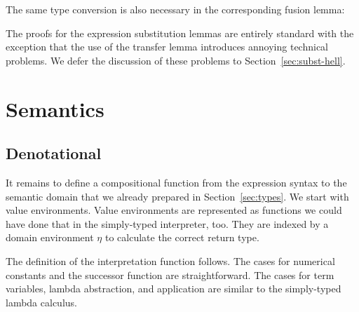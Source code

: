 \documentclass[acmsmall,anonymous,review,screen]{acmart}
\begin{document}
The same type conversion is also necessary in the corresponding fusion lemma:
\SubstExamplesFusionESubESub

The proofs for the expression substitution lemmas are entirely standard with the
exception that the use of the transfer lemma introduces annoying technical problems.
We defer the discussion of these problems to Section~\ref{sec:subst-hell}.


\section{Semantics}
\label{sec:semantics}

\subsection{Denotational}
\label{sec:denotational}



It remains to define a compositional function from the expression
syntax to the semantic domain that we already prepared in
Section~\ref{sec:types}. We start with value environments.
\TFVEnv
Value environments are represented as functions \textemdash{} we could have done
that in the simply-typed interpreter, too. They are indexed by a
domain environment $\eta$ to calculate the correct return type.

The definition of the interpretation function follows.
\TFExprSem
The cases for numerical constants and the successor function are straightforward.
The cases for term variables, lambda abstraction, and application are
similar to the  simply-typed lambda calculus.
\end{document}
